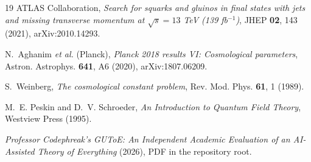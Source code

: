 \documentclass[11pt]{article}
\theoremstyle{remark}
\begin{document}
\begin{thebibliography}{19}
 ATLAS Collaboration, \emph{Search for squarks and
gluinos in final states with jets and missing transverse momentum at
$\sqrt{s} = 13$ TeV (139 fb$^{-1}$)}, JHEP \textbf{02}, 143 (2021),
arXiv:2010.14293.

 N.~Aghanim \emph{et al.} (Planck), \emph{Planck 2018
results VI: Cosmological parameters}, Astron. Astrophys. \textbf{641},
A6 (2020), arXiv:1807.06209.

 S.~Weinberg, \emph{The cosmological constant
problem}, Rev. Mod. Phys. \textbf{61}, 1 (1989).

 M.~E. Peskin and D.~V. Schroeder, \emph{An
Introduction to Quantum Field Theory}, Westview Press (1995).

 \emph{Professor Codephreak's GUToE: An Independent
Academic Evaluation of an AI-Assisted Theory of Everything} (2026), PDF
in the repository root.

\end{thebibliography}
\end{document}
